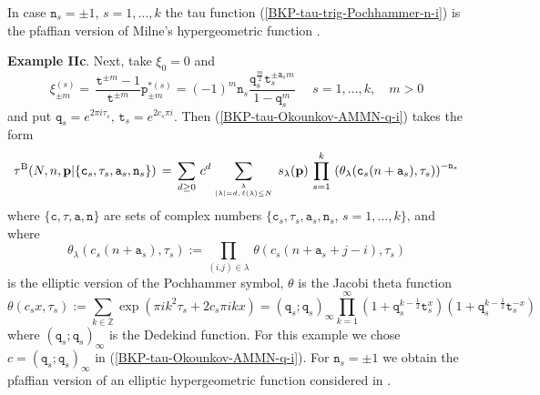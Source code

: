 \documentclass[a4paper,10pt]{article}
\newcommand{\bpow}{\mathbf{p}}
\theoremstyle{plain}
\theoremstyle{remark}
\def\be{\begin{equation}}
\def\ee{\end{equation}}
\begin{document}
In case $\texttt{n}_s=\pm 1$, $s=1,\dots,k$ the tau function (\ref{BKP-tau-trig-Pochhammer-n-i}) is the pfaffian
version of Milne's hypergeometric function \cite{Milne}.


{\bf Example IIc}. Next, take $\xi_0=0$ and
\[
 \xi_{\pm m}^{(s)}
 =\,\frac{\texttt{t}^{\pm m}-1}{\texttt{t}^{\pm m}}\texttt{p}_{\pm m}^{*(s)}=
 (-1)^{m}\texttt{n}_s\frac {\texttt{q}_s^{\frac m2} \texttt{t}_s^{\pm\texttt{a}_sm}}{1-\texttt{q}_s^m}\,\,
 \quad s=1,\dots,k,\quad m>0
\]
and put $\texttt{q}_s=e^{2\pi i \tau_s},\, \texttt{t}_s=e^{2c_s\pi i}$.
Then (\ref{BKP-tau-Okounkov-AMMN-q-i}) takes the form
\be\label{BKP-tau-elliptic-Poch}
\tau^{\rm B}(N,n,\bpow |\{\texttt{c}_s,\tau_s,\texttt{a}_s,\texttt{n}_s\})\,=\,\sum_{d\ge 0} \, c^d
\sum_{\lambda\atop |\lambda|=d,\, \ell(\lambda)\le N}\,s_\lambda(\bpow)\,
\prod_{s=1}^k\,\left(\theta_\lambda(\texttt{c}_s(n+\texttt{a}_s),\tau_s) \right)^{-\texttt{n}_s}
\ee
where  $\{\texttt{c},\tau,\texttt{a},\texttt{n}\}$ are sets of complex numbers
$\{\texttt{c}_s,\tau_s,\texttt{a}_s,\texttt{n}_s$, $s=1,\dots,k\}$, and where
\[
 \theta_\lambda(c_s(n+\texttt{a}_s),\tau_s) :=
 \prod_{(i.j)\in\lambda}\,\theta(c_s(n+\texttt{a}_s+j-i),\tau_s)
\]
is the elliptic version of the Pochhammer symbol, $\theta$ is the Jacobi theta function
\[
 \theta(c_s x,\tau_s):=\sum_{k\in\mathbb{Z}}\exp (\pi i k^2 \tau_s + 2c_s\pi i k x)=
 (\texttt{q}_s;\texttt{q}_s)_\infty
\prod_{k=1}^\infty \left(1 + \texttt{q}_s^{k-{\frac 12}} \texttt{t}_s^{ x}\right)\left(1 +
\texttt{q}_s^{k-{\frac 12}} \texttt{t}_s^{- x}\right)
\]
where $(\texttt{q}_s;\texttt{q}_s)_\infty$ is the Dedekind function. For this example we chose
$c=(\texttt{q}_s;\texttt{q}_s)_\infty$
in (\ref{BKP-tau-Okounkov-AMMN-q-i}).
For $\texttt{n}_s=\pm 1$ we obtain the pfaffian version
of an elliptic hypergeometric function considered in \cite{OS-2000}.
\end{document}
